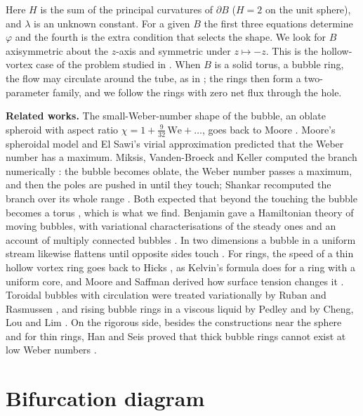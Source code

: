 \documentclass[11pt]{article}
\begin{document}
Here \(H\) is the sum of the principal curvatures of \(\partial B\) (\(H = 2\) on the unit sphere), and \(\lambda\) is an unknown constant. For a given \(B\) the first three equations determine \(\varphi\) and the fourth is the extra condition that selects the shape. We look for \(B\) axisymmetric about the \(z\)-axis and symmetric under \(z \mapsto -z\). This is the hollow-vortex case of the problem studied in \cite{mns}. When \(B\) is a solid torus, a bubble ring, the flow may circulate around the tube, as in \cite{ms}; the rings then form a two-parameter family, and we follow the rings with zero net flux through the hole.

\textbf{Related works.} The small-Weber-number shape of the bubble, an oblate spheroid with aspect ratio \(\chi = 1 + \tfrac{9}{32}\,\mathrm{We} + \dots\), goes back to Moore \cite{moore1959}. Moore's spheroidal model \cite{moore1965} and El Sawi's virial approximation \cite{elsawi} predicted that the Weber number has a maximum. Miksis, Vanden-Broeck and Keller computed the branch numerically \cite{mvk}: the bubble becomes oblate, the Weber number passes a maximum, and then the poles are pushed in until they touch; Shankar recomputed the branch over its whole range \cite{shankar2005}. Both expected that beyond the touching the bubble becomes a torus \cite{mvk,shankar2005}, which is what we find. Benjamin gave a Hamiltonian theory of moving bubbles, with variational characterisations of the steady ones and an account of multiply connected bubbles \cite{benjamin}. In two dimensions a bubble in a uniform stream likewise flattens until opposite sides touch \cite{vbk1980,shankar1992}. For rings, the speed of a thin hollow vortex ring goes back to Hicks \cite{hicks}, as Kelvin's formula \cite{kelvin} does for a ring with a uniform core, and Moore and Saffman derived how surface tension changes it \cite{mooresaffman}. Toroidal bubbles with circulation were treated variationally by Ruban and Rasmussen \cite{rubanrasmussen}, and rising bubble rings in a viscous liquid by Pedley \cite{pedley1968} and by Cheng, Lou and Lim \cite{chenglouLim}. On the rigorous side, besides the constructions \cite{mns} near the sphere and \cite{ms} for thin rings, Han and Seis proved that thick bubble rings cannot exist at low Weber numbers \cite{hanseis}.

\section*{Bifurcation diagram}
\end{document}
